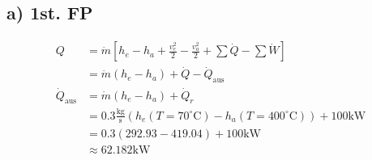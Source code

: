 \subsection*{a) 1st. FP}
\begin{align*}
Q &= \dot{m} [h_e - h_a + \frac{v_e^2}{2} - \frac{v_a^2}{2} + \sum \dot{Q} - \sum \dot{W}] \\
&= \dot{m} (h_e - h_a) + \dot{Q} - \dot{Q}_{\text{aus}} \\
\dot{Q}_{\text{aus}} &= \dot{m} (h_e - h_a) + \dot{Q}_r \\
&= 0.3 \frac{\text{kg}}{\text{s}} (h_e (T = 70^\circ \text{C}) - h_a (T = 400^\circ \text{C})) + 100 \text{kW} \\
&= 0.3 (292.93 - 419.04) + 100 \text{kW} \\
&\approx 62.182 \text{kW}
\end{align*}